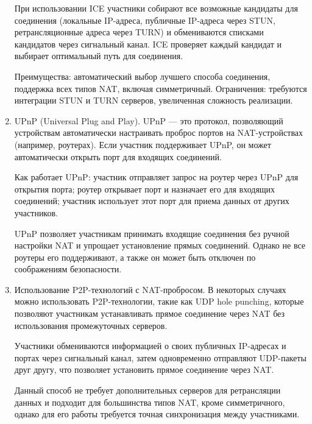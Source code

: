 \begin{enumerate}
  При использовании ICE участники собирают все возможные кандидаты для соединения (локальные IP-адреса, публичные IP-адреса через STUN, ретрансляционные адреса через TURN) и обмениваются списками кандидатов через сигнальный канал.
  ICE проверяет каждый кандидат и выбирает оптимальный путь для соединения.
  
  Преимущества: автоматический выбор лучшего способа соединения, поддержка всех типов NAT, включая симметричный.
  Ограничения: требуются интеграции STUN и TURN серверов, увеличенная сложность реализации.

  \item UPnP (Universal Plug and Play).
  UPnP --- это протокол, позволяющий устройствам автоматически настраивать проброс портов на NAT-устройствах (например, роутерах).
  Если участник поддерживает UPnP, он может автоматически открыть порт для входящих соединений.

  Как работает UPnP: участник отправляет запрос на роутер через UPnP для открытия порта; роутер открывает порт и назначает его для входящих соединений; участник использует этот порт для приема данных от других участников.

  UPnP позволяет участникам принимать входящие соединения без ручной настройки NAT и  упрощает установление прямых соединений.
  Однако не все роутеры его поддерживают, а также он может быть отключен по соображениям безопасности.

  \item Использование P2P-технологий с NAT-пробросом.
  В некоторых случаях можно использовать P2P-технологии, такие как UDP hole punching, которые позволяют участникам устанавливать прямое соединение через NAT без использования промежуточных серверов.

  Участники обмениваются информацией о своих публичных IP-адресах и портах через сигнальный канал, затем одновременно отправляют UDP-пакеты друг другу, что позволяет установить прямое соединение через NAT.

  Данный способ не требует дополнительных серверов для ретрансляции данных и подходит для большинства типов NAT, кроме симметричного, однако для его работы требуется точная синхронизация между участниками.
\end{enumerate}
